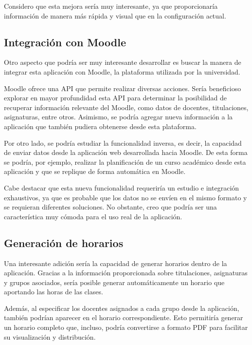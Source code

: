 Considero que esta mejora sería muy interesante, ya que proporcionaría información de manera más rápida y visual que en la configuración actual.

\subsection{Integración con Moodle}
Otro aspecto que podría ser muy interesante desarrollar es buscar la manera de integrar esta aplicación con Moodle, la plataforma utilizada por la universidad.

Moodle ofrece una API que permite realizar diversas acciones. 
Sería beneficioso explorar en mayor profundidad esta API para determinar la posibilidad de recuperar información relevante del Moodle, como datos de docentes, titulaciones, asignaturas, entre otros. 
Asimismo, se podría agregar nueva información a la aplicación que también pudiera obtenerse desde esta plataforma.

Por otro lado, se podría estudiar la funcionalidad inversa, es decir, la capacidad de enviar datos desde la aplicación web desarrollada hacia Moodle.
De esta forma se podría, por ejemplo, realizar la planificación de un curso académico desde esta aplicación y que se replique de forma automática en Moodle.

Cabe destacar que esta nueva funcionalidad requeriría un estudio e integración exhaustivos, ya que es probable que los datos no se envíen en el mismo formato y se requieran diferentes soluciones.
No obstante, creo que podría ser una característica muy cómoda para el uso real de la aplicación.

\subsection{Generación de horarios}
Una interesante adición sería la capacidad de generar horarios dentro de la aplicación. 
Gracias a la información proporcionada sobre titulaciones, asignaturas y grupos asociados, sería posible generar automáticamente un horario que aportando las horas de las clases.

Además, al especificar los docentes asignados a cada grupo desde la aplicación, también podrían aparecer en el horario correspondiente. 
Esto permitiría generar un horario completo que, incluso, podría convertirse a formato PDF para facilitar su visualización y distribución.



